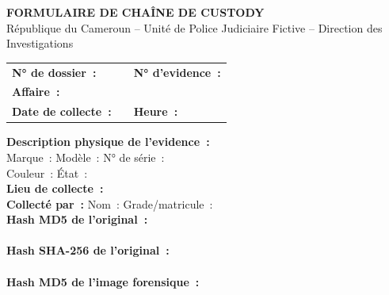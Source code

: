 \begin{boxcustody}
\begin{center}
{\bfseries\color{CouleurPrimaire} FORMULAIRE DE CHAÎNE DE CUSTODY}\\[0.5ex]
{\small République du Cameroun -- Unité de Police Judiciaire Fictive -- Direction des Investigations}
\end{center}
\vspace{0.5ex}
\begin{tabular}{p{4cm}p{3.5cm}p{4cm}}
\textbf{N° de dossier~:} & \underline{\hspace{3cm}} &
\textbf{N° d'evidence~:} \underline{\hspace{2cm}} \\[0.6ex]
\textbf{Affaire~:} & \multicolumn{2}{l}{\underline{\hspace{7cm}}} \\[0.6ex]
\textbf{Date de collecte~:} & \underline{\hspace{3cm}} &
\textbf{Heure~:} \underline{\hspace{2cm}} \\[0.6ex]
\end{tabular}
\vspace{0.5ex}
\textbf{Description physique de l'evidence~:}\\
Marque~: \underline{\hspace{3.5cm}}
Modèle~: \underline{\hspace{3.5cm}}
N° de série~: \underline{\hspace{3.5cm}}\\
Couleur~: \underline{\hspace{3cm}}
État~: \underline{\hspace{5cm}} \\[0.5ex]
\textbf{Lieu de collecte~:} \underline{\hspace{6cm}}\\[0.5ex]
\textbf{Collecté par~:} Nom~: \underline{\hspace{3cm}}
Grade/matricule~: \underline{\hspace{3cm}}\\[0.5ex]
\textbf{Hash MD5 de l'original~:}\\
\texttt{\underline{\hspace{10cm}}}\\[0.3ex]
\textbf{Hash SHA-256 de l'original~:}\\
\texttt{\underline{\hspace{10cm}}}\\[0.5ex]
\textbf{Hash MD5 de l'image forensique~:}\\

\end{boxcustody}
